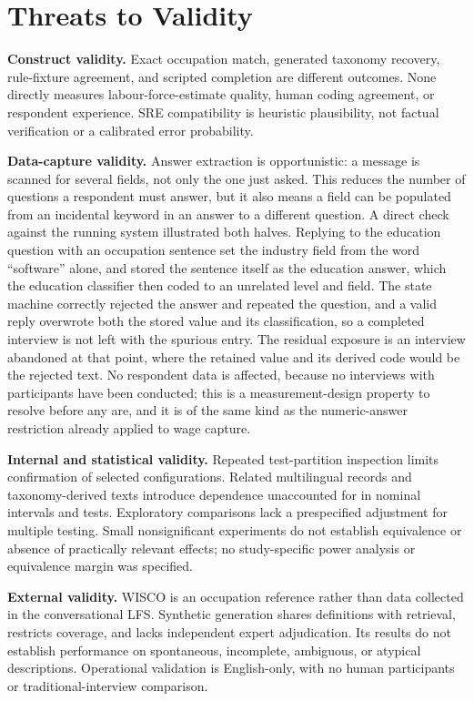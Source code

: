 \section{Threats to Validity}
\label{sec:res-validity}

\noindent\textbf{Construct validity.}
Exact occupation match, generated taxonomy recovery, rule-fixture agreement,
and scripted completion are different outcomes. None directly measures
labour-force-estimate quality, human coding agreement, or respondent
experience. SRE compatibility is heuristic plausibility, not factual
verification or a calibrated error probability.

\noindent\textbf{Data-capture validity.}
Answer extraction is opportunistic: a message is scanned for several
fields, not only the one just asked. This reduces the number of questions a
respondent must answer, but it also means a field can be populated from an
incidental keyword in an answer to a different question. A direct check
against the running system illustrated both halves. Replying to the
education question with an occupation sentence set the industry field from
the word ``software'' alone, and stored the sentence itself as the
education answer, which the education classifier then coded to an unrelated
level and field. The state machine correctly rejected the answer and
repeated the question, and a valid reply overwrote both the stored value
and its classification, so a completed interview is not left with the
spurious entry. The residual exposure is an interview abandoned at that
point, where the retained value and its derived code would be the rejected
text. No respondent data is affected, because no interviews with
participants have been conducted; this is a measurement-design property to
resolve before any are, and it is of the same kind as the numeric-answer
restriction already applied to wage capture.

\noindent\textbf{Internal and statistical validity.}
Repeated test-partition inspection limits confirmation of selected
configurations. Related multilingual records and taxonomy-derived texts
introduce dependence unaccounted for in nominal intervals and tests.
Exploratory comparisons lack a prespecified adjustment for multiple testing.
Small nonsignificant experiments do not establish equivalence or absence
of practically relevant effects; no study-specific power analysis or
equivalence margin was specified.

\noindent\textbf{External validity.}
WISCO is an occupation reference rather than data collected in the
conversational LFS. Synthetic generation shares definitions with retrieval,
restricts coverage, and lacks independent expert adjudication. Its results
do not establish performance on spontaneous, incomplete, ambiguous, or
atypical descriptions. Operational validation is English-only, with no
human participants or traditional-interview comparison.

